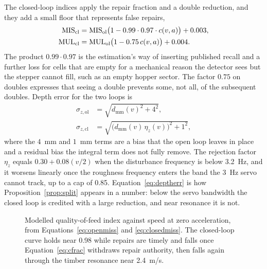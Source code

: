 The closed-loop indices apply the repair fraction and a double reduction, and they add a small floor that represents false repairs,
\begin{equation}
\label{eq:closedmiss}
\begin{aligned}
\mathrm{MIS}_{\mathrm{cl}} &= \mathrm{MIS}_{\mathrm{ol}}\bigl(1 - 0.99\cdot 0.97\cdot c(v,a)\bigr) + 0.003,\\
\mathrm{MUL}_{\mathrm{cl}} &= \mathrm{MUL}_{\mathrm{ol}}\bigl(1 - 0.75\, c(v,a)\bigr) + 0.004.
\end{aligned}
\end{equation}
The product \(0.99\cdot 0.97\) is the estimation's way of inserting published recall and a further loss for cells that are empty for a mechanical reason the detector sees but the stepper cannot fill, such as an empty hopper sector. The factor \(0.75\) on doubles expresses that seeing a double prevents some, not all, of the subsequent doubles. Depth error for the two loops is
\begin{equation}
\label{eq:deptherr}
\begin{aligned}
\sigma_{z,\mathrm{ol}} &= \sqrt{d_{\mathrm{mm}}(v)^2 + 4^2},\\
\sigma_{z,\mathrm{cl}} &= \sqrt{\bigl(d_{\mathrm{mm}}(v)\,\eta_z(v)\bigr)^2 + 1^2},
\end{aligned}
\end{equation}
where the \(4\)~mm and \(1\)~mm terms are a bias that the open loop leaves in place and a residual bias the integral term does not fully remove. The rejection factor \(\eta_z\) equals \(0.30+0.08(v/2)\) when the disturbance frequency is below \SI{3.2}{Hz}, and it worsens linearly once the roughness frequency enters the band the \SI{3}{Hz} servo cannot track, up to a cap of \num{0.85}. Equation~\eqref{eq:deptherr} is how Proposition~\ref{prop:split} appears in a number: below the servo bandwidth the closed loop is credited with a large reduction, and near resonance it is not.

\begin{figure}[ht]
\centering
{}
\caption{Modelled quality-of-feed index against speed at zero acceleration, from Equations~\eqref{eq:openmiss} and \eqref{eq:closedmiss}. The closed-loop curve holds near \num{0.98} while repairs are timely and falls once Equation~\eqref{eq:cfrac} withdraws repair authority, then falls again through the timber resonance near \SI{2.4}{m/s}.}
\label{fig:qfi}
\end{figure}

